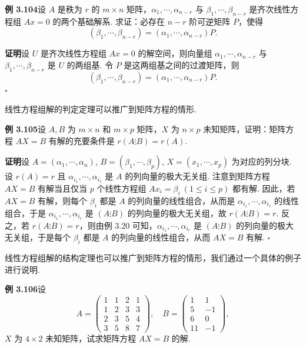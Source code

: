 \documentclass[UTF8, 12pt, fontset=fandol, oneside]{ctexart}
\begin{document}
\noindent\textbf{例 3.104}\quad 设 $A$ 是秩为 $r$ 的 $m\times n$ 矩阵，$\alpha_1,\cdots,\alpha_{n-r}$ 与 $\beta_1,\cdots,\beta_{n-r}$ 是齐次线性方程组 $Ax=0$ 的两个基础解系. 求证：必存在 $n-r$ 阶可逆矩阵 $P$，使得
\[
(\beta_1,\cdots,\beta_{n-r})=(\alpha_1,\cdots,\alpha_{n-r})P.
\]

\noindent\textbf{证明}\quad 设 $U$ 是齐次线性方程组 $Ax=0$ 的解空间，则向量组 $\alpha_1,\cdots,\alpha_{n-r}$ 与 $\beta_1,\cdots,\beta_{n-r}$ 是 $U$ 的两组基. 令 $P$ 是这两组基之间的过渡矩阵，则
\[
(\beta_1,\cdots,\beta_{n-r})=(\alpha_1,\cdots,\alpha_{n-r})P.
\]
$\square$

线性方程组解的判定定理可以推广到矩阵方程的情形.

\noindent\textbf{例 3.105}\quad 设 $A,B$ 为 $m\times n$ 和 $m\times p$ 矩阵，$X$ 为 $n\times p$ 未知矩阵，证明：矩阵方程 $AX=B$ 有解的充要条件是 $r(A\vdots B)=r(A)$.

\noindent\textbf{证明}\quad 设 $A=(\alpha_1,\cdots,\alpha_n)$, $B=(\beta_1,\cdots,\beta_p)$, $X=(x_1,\cdots,x_p)$ 为对应的列分块. 设 $r(A)=r$ 且 $\alpha_{i_1},\cdots,\alpha_{i_r}$ 是 $A$ 的列向量的极大无关组. 注意到矩阵方程 $AX=B$ 有解当且仅当 $p$ 个线性方程组 $Ax_i=\beta_i\ (1\le i\le p)$ 都有解. 因此，若 $AX=B$ 有解，则每个 $\beta_i$ 都是 $A$ 的列向量的线性组合，从而是 $\alpha_{i_1},\cdots,\alpha_{i_r}$ 的线性组合，于是 $\alpha_{i_1},\cdots,\alpha_{i_r}$ 是 $(A\vdots B)$ 的列向量的极大无关组，故 $r(A\vdots B)=r$. 反之，若 $r(A\vdots B)=r$，则由例 3.20 可知，$\alpha_{i_1},\cdots,\alpha_{i_r}$ 是 $(A\vdots B)$ 的列向量的极大无关组，于是每个 $\beta_i$ 都是 $A$ 的列向量的线性组合，从而 $AX=B$ 有解. $\square$

线性方程组解的结构定理也可以推广到矩阵方程的情形，我们通过一个具体的例子进行说明.

\noindent\textbf{例 3.106}\quad 设
\[
A=\begin{pmatrix}
1&1&2&1\\
1&2&3&3\\
2&3&5&4\\
3&5&8&7
\end{pmatrix},\quad
B=\begin{pmatrix}
1&1\\
5&-1\\
6&0\\
11&-1
\end{pmatrix},
\]
$X$ 为 $4\times 2$ 未知矩阵，试求矩阵方程 $AX=B$ 的解.
\end{document}
